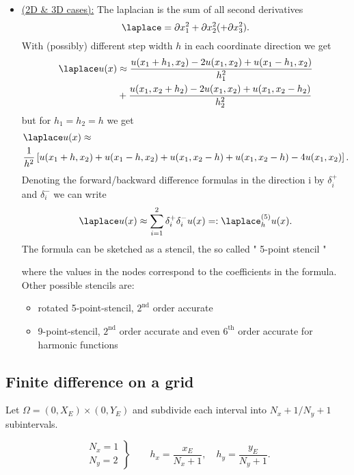 \begin{itemize}
	\item \underline{(2D \& 3D cases):} 
		The laplacian is the sum of all second derivatives
		\[
			\laplace = \partial x_1^2 + \partial x_2^2 (+\partial x_3^2)
		.\] 
		With (possibly) different step width $h$ in each coordinate direction we get
		\begin{align*}
			\laplace u(x) &\approx \frac{u(x_1 + h_1, x_2) - 2u(x_1, x_2) + u(x_1 -h_1, x_2)}{h_1^2}\\
						  &+ \frac{u(x_1, x_2 + h_2) - 2u(x_1, x_2) + u(x_1, x_2 -h_2)}{h_2^2}
		\end{align*}
		but for $h_1 = h_2 = h$ we get
		\begin{align*}
			&\laplace u(x) \approx\\ 
			&\frac{1}{h^2}\left[u(x_1+ h, x_2) + u(x_1-h, x_2) + u(x_1, x_2 -h) + u(x_1, x_2 -h) -4u(x_1, x_2)\right].
		\end{align*}
		Denoting the forward/backward difference formulas
		in the direction i by $\delta_{i}^{+}$ and $\delta_{i}^{-}$ we can write
		\[
			\laplace u(x) \approx \sum_{i=1}^{2}{\delta_{i}^{+}\delta_{i}^{-}u(x)}=:\laplace_{h}^{(5)}u(x)
		.\] 
		The formula can be sketched as a stencil, the so called " 5-point stencil "
		
		where the values in the nodes correspond to the coefficients in the formula.
		Other possible stencils are:
		\begin{itemize}
			\item rotated 5-point-stencil, $2^{\text{nd}}$ order accurate
				
			\item 9-point-stencil,  $2^{\text{nd}}$ order accurate and even $6^{\text{th}}$ order accurate for harmonic functions
				
		\end{itemize}
\end{itemize}

\subsection{Finite difference on a grid}%
\label{sec:Finite difference on a grid}
Let $\Omega =(0, X_{E}) \times (0,Y_{E})$ and subdivide each interval into $N_{x}+1 / N_{y} + 1$ subintervals.

\[
\left.
	\begin{array}{c}
	N_{x} = 1 \\
	N_{y} = 2
\end{array}
\right\} \qquad
h_{x} = \frac{x_{E}}{N_{x}+1}, \quad h_{y}= \frac{y_{E}}{N_{y}+1}
.\] 

